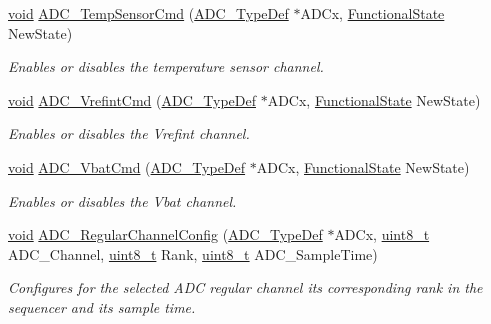 \begin{DoxyCompactItemize}
\hyperlink{group___n_a_m_e_ga18028b8badbf1ea7e704ccac3c488e82}{void} \hyperlink{group___a_d_c___exported___constants_ga0dd3e001351a4b767d198e7ea9847bd0}{A\-D\-C\-\_\-\-Temp\-Sensor\-Cmd} (\hyperlink{struct_a_d_c___type_def}{A\-D\-C\-\_\-\-Type\-Def} $\ast$A\-D\-Cx, \hyperlink{group___exported__types_gac9a7e9a35d2513ec15c3b537aaa4fba1}{Functional\-State} New\-State)
\begin{DoxyCompactList}\small\item\em Enables or disables the temperature sensor channel. \end{DoxyCompactList}\item 
\hyperlink{group___n_a_m_e_ga18028b8badbf1ea7e704ccac3c488e82}{void} \hyperlink{group___a_d_c___exported___constants_ga5a0cdd8c4dd4a36e6b0b06c369608fa0}{A\-D\-C\-\_\-\-Vrefint\-Cmd} (\hyperlink{struct_a_d_c___type_def}{A\-D\-C\-\_\-\-Type\-Def} $\ast$A\-D\-Cx, \hyperlink{group___exported__types_gac9a7e9a35d2513ec15c3b537aaa4fba1}{Functional\-State} New\-State)
\begin{DoxyCompactList}\small\item\em Enables or disables the Vrefint channel. \end{DoxyCompactList}\item 
\hyperlink{group___n_a_m_e_ga18028b8badbf1ea7e704ccac3c488e82}{void} \hyperlink{group___a_d_c___exported___constants_gacc19bfc67bbfd42c6f8f2617e82109c8}{A\-D\-C\-\_\-\-Vbat\-Cmd} (\hyperlink{struct_a_d_c___type_def}{A\-D\-C\-\_\-\-Type\-Def} $\ast$A\-D\-Cx, \hyperlink{group___exported__types_gac9a7e9a35d2513ec15c3b537aaa4fba1}{Functional\-State} New\-State)
\begin{DoxyCompactList}\small\item\em Enables or disables the Vbat channel. \end{DoxyCompactList}\item 
\hyperlink{group___n_a_m_e_ga18028b8badbf1ea7e704ccac3c488e82}{void} \hyperlink{group___a_d_c___exported___constants_gac531adb577b648d4bb8881f2ed627d52}{A\-D\-C\-\_\-\-Regular\-Channel\-Config} (\hyperlink{struct_a_d_c___type_def}{A\-D\-C\-\_\-\-Type\-Def} $\ast$A\-D\-Cx, \hyperlink{stdint_8h_aba7bc1797add20fe3efdf37ced1182c5}{uint8\-\_\-t} A\-D\-C\-\_\-\-Channel, \hyperlink{stdint_8h_aba7bc1797add20fe3efdf37ced1182c5}{uint8\-\_\-t} Rank, \hyperlink{stdint_8h_aba7bc1797add20fe3efdf37ced1182c5}{uint8\-\_\-t} A\-D\-C\-\_\-\-Sample\-Time)
\begin{DoxyCompactList}\small\item\em Configures for the selected A\-D\-C regular channel its corresponding rank in the sequencer and its sample time. \end{DoxyCompactList}\item 

\end{DoxyCompactItemize}
